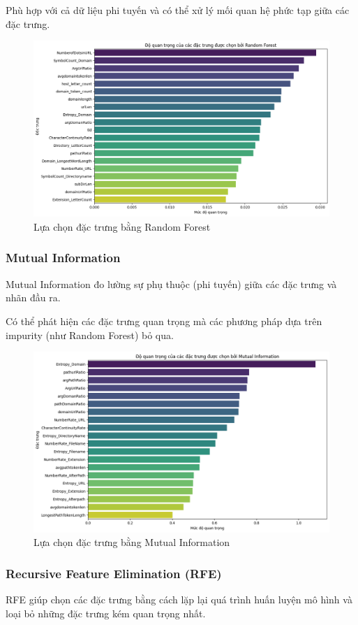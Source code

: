 \documentclass[13pt]{article}
\begin{document}
Phù hợp với cả dữ liệu phi tuyến và có thể xử lý mối quan hệ phức tạp giữa các đặc trưng.

    \begin{figure}[h!]
        \centering        \includegraphics[width=0.7\linewidth]{image/h19.png}
            \caption{Lựa chọn đặc trưng bằng Random Forest}
            \label{fig:label1}
    \end{figure}

\subsubsection{Mutual Information}
Mutual Information đo lường sự phụ thuộc (phi tuyến) giữa các đặc trưng và nhãn đầu ra.

Có thể phát hiện các đặc trưng quan trọng mà các phương pháp dựa trên impurity (như Random Forest) bỏ qua.

    \begin{figure}[h!]
        \centering        \includegraphics[width=0.7\linewidth]{image/h20.png}
            \caption{Lựa chọn đặc trưng bằng Mutual Information}
            \label{fig:label1}
    \end{figure}

\subsubsection{Recursive Feature Elimination (RFE)}
RFE giúp chọn các đặc trưng bằng cách lặp lại quá trình huấn luyện mô hình và loại bỏ những đặc trưng kém quan trọng nhất.
\end{document}
